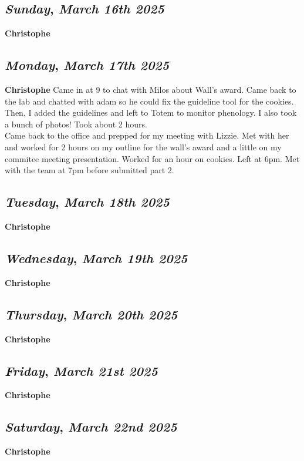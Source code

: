 \def\day{\textit{March 16th 2025}}
\def\weekday{\textit{Sunday}}
\subsection*{\weekday, \day}
\textbf {Christophe}

\def\day{\textit{March 17th 2025}}
\def\weekday{\textit{Monday}}
\subsection*{\weekday, \day}
\textbf {Christophe}
Came in at 9 to chat with Milos about Wall's award. Came back to the lab and chatted with adam so he could fix the guideline tool for the cookies. Then, I added the guidelines and left to Totem to monitor phenology. I also took a bunch of photos! Took about 2 hours. \\
Came back to the office and prepped for my meeting with Lizzie. Met with her and worked for 2 hours on my outline for the wall's award and a little on my commitee meeting presentation. Worked for an hour on cookies. Left at 6pm. Met with the team at 7pm before submitted part 2. 
\def\day{\textit{March 18th 2025}}
\def\weekday{\textit{Tuesday}}
\subsection*{\weekday, \day}
\textbf {Christophe}

\def\day{\textit{March 19th 2025}}
\def\weekday{\textit{Wednesday}}
\subsection*{\weekday, \day}
\textbf {Christophe}

\def\day{\textit{March 20th 2025}}
\def\weekday{\textit{Thursday}}
\subsection*{\weekday, \day}
\textbf {Christophe}

\def\day{\textit{March 21st 2025}}
\def\weekday{\textit{Friday}}
\subsection*{\weekday, \day}
\textbf {Christophe}

\def\day{\textit{March 22nd 2025}}
\def\weekday{\textit{Saturday}}
\subsection*{\weekday, \day}
\textbf {Christophe}

